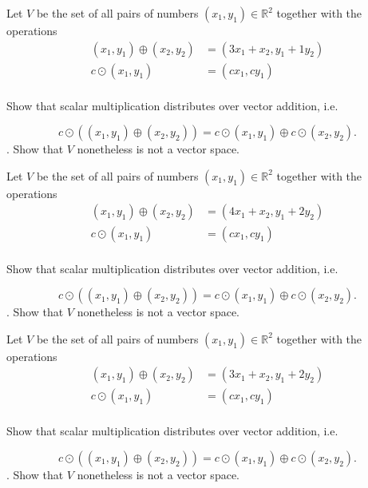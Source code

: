 \documentclass{article}
\begin{document}
\begin{exerciseStatement}
    Let \(V\) be the set of all pairs of numbers \((x_1,y_1)\in\mathbb{R}^2\)  together with the operations
\begin{align*}
(x_1,y_1)\oplus (x_2,y_2)&= (3x_1+x_2, y_1+1y_2)\\
c \odot (x_1,y_1) &= (cx_1,cy_1)\\
\end{align*}

Show that scalar multiplication distributes over vector addition, i.e.

\[c\odot \left((x_1,y_1)\oplus(x_2,y_2)\right)=c\odot(x_1,y_1)\oplus c\odot(x_2,y_2).\]
.
Show that \(V\) nonetheless is not a vector space.



  
\end{exerciseStatement}

\begin{exerciseStatement}
    Let \(V\) be the set of all pairs of numbers \((x_1,y_1)\in\mathbb{R}^2\)  together with the operations
\begin{align*}
(x_1,y_1)\oplus (x_2,y_2)&= (4x_1+x_2, y_1+2y_2)\\
c \odot (x_1,y_1) &= (cx_1,cy_1)\\
\end{align*}

Show that scalar multiplication distributes over vector addition, i.e.

\[c\odot \left((x_1,y_1)\oplus(x_2,y_2)\right)=c\odot(x_1,y_1)\oplus c\odot(x_2,y_2).\]
.
Show that \(V\) nonetheless is not a vector space.



  
\end{exerciseStatement}

\begin{exerciseStatement}
    Let \(V\) be the set of all pairs of numbers \((x_1,y_1)\in\mathbb{R}^2\)  together with the operations
\begin{align*}
(x_1,y_1)\oplus (x_2,y_2)&= (3x_1+x_2, y_1+2y_2)\\
c \odot (x_1,y_1) &= (cx_1,cy_1)\\
\end{align*}

Show that scalar multiplication distributes over vector addition, i.e.

\[c\odot \left((x_1,y_1)\oplus(x_2,y_2)\right)=c\odot(x_1,y_1)\oplus c\odot(x_2,y_2).\]
.
Show that \(V\) nonetheless is not a vector space.



  
\end{exerciseStatement}
\end{document}
